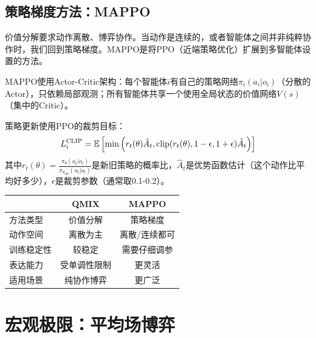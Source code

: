 \subsection{策略梯度方法：MAPPO}

价值分解要求动作离散、博弈协作。当动作是连续的，或者智能体之间并非纯粹协作时，我们回到策略梯度。MAPPO是将PPO（近端策略优化）扩展到多智能体设置的方法。

\begin{definition}[MAPPO]
MAPPO使用Actor-Critic架构：每个智能体$i$有自己的策略网络$\pi_i(a_i | o_i)$（分散的Actor），只依赖局部观测；所有智能体共享一个使用全局状态的价值网络$V(s)$（集中的Critic）。

策略更新使用PPO的裁剪目标：
\begin{equation}
    L^{\text{CLIP}}_i = \mathbb{E}\left[ \min\left( r_t(\theta) \hat{A}_t, \text{clip}(r_t(\theta), 1-\epsilon, 1+\epsilon) \hat{A}_t \right) \right]
\end{equation}
其中$r_t(\theta) = \frac{\pi_\theta(a_t | o_t)}{\pi_{\theta_{\text{old}}}(a_t | o_t)}$是新旧策略的概率比，$\hat{A}_t$是优势函数估计（这个动作比平均好多少），$\epsilon$是裁剪参数（通常取0.1-0.2）。
\end{definition}

\begin{remark}
\begin{center}
\begin{tabular}{l|cc}
\toprule
& \textbf{QMIX} & \textbf{MAPPO} \\
\midrule
方法类型 & 价值分解 & 策略梯度 \\
动作空间 & 离散为主 & 离散/连续都可 \\
训练稳定性 & 较稳定 & 需要仔细调参 \\
表达能力 & 受单调性限制 & 更灵活 \\
适用场景 & 纯协作博弈 & 更广泛 \\
\bottomrule
\end{tabular}
\end{center}
\end{remark}

\section{宏观极限：平均场博弈}

